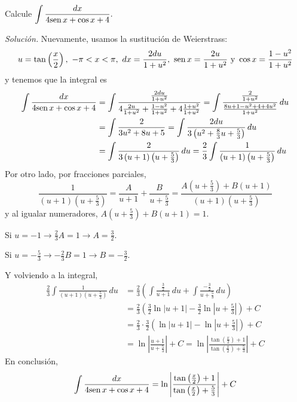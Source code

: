 \begin{ejemplo}
Calcule $\displaystyle{\int \frac{dx}{4\text{\rm sen}\,x+\cos x+4}}.$
\end{ejemplo}
\textit{Solución.} Nuevamente, usamos la sustitución de Weierstrass:
{\small
\[
u=\tan \left( \frac{x}{2}\right),\ -\pi<x<\pi,\ dx=\frac{2du}{1+u^{2}},\ \text{\rm sen}\, x=\frac{2u}{1+u^{2}}\text{ y }\cos x=\frac{1-u^{2}}{1+u^{2}}
\]
}
y tenemos que la integral es
{\small
\begin{align*}
\int \frac{dx}{4\sen x+\cos x+4}&=\int \frac{\frac{2du}{1+u^{2}}}{4\frac{2u}{1+u^{2}}+\frac{1-u^{2}}{1+u^{2}}%
+4\frac{1+u^{2}}{1+u^{2}}}=\int \frac{\frac{2}{1+u^{2}}}{\frac{%
8u+1-u^{2}+4+4u^{2}}{1+u^{2}}}\, du\\
&=\int \frac{2}{3u^{2}+8u+5}=\int \frac{2du}{%
3\left( u^{2}+\frac{8}{3}u+\frac{5}{3}\right) }\, du\\
&=\int \frac{2}{3\left( u+1\right) \left( u+\frac{5}{3}\right) }\, du=\frac{2}{3%
}\int \frac{1}{\left( u+1\right) \left( u+\frac{5}{3}\right) }\, du
\end{align*}
}
Por otro lado, por fracciones parciales,
{\small
\[
\frac{1}{\left( u+1\right) \left( u+\frac{5}{3}\right) }=\frac{A}{u+1}%
+\frac{B}{u+\frac{5}{3}}=\frac{A\left( u+\frac{5}{3}\right) +B\left(
u+1\right) }{\left( u+1\right) \left( u+\frac{5}{3}\right) }
\]
}
y al igualar numeradores, $A\left( u+\frac{5}{3}\right) +B\left( u+1\right) =1.$

Si $u=-1\rightarrow \frac{2}{3}A=1\rightarrow A=\frac{3}{2}$.

Si $u=-\frac{5}{3}\rightarrow -\frac{2}{3}B=1\rightarrow B=-\frac{3}{2}$.

Y volviendo a la integral,
{\small
\begin{align*}
	\frac{2}{3}\int \frac{1}{(u\!+\!1)(u\!+\!\frac{5}{3})} \, du
	&= \frac{2}{3}\left( \int \frac{\frac{3}{2}}{u\!+\!1} \, du + \int \frac{-\frac{3}{2}}{u\!+\!\frac{5}{3}} \, du \right) \\
	&= \frac{2}{3}\left( \frac{3}{2}\ln\left|u\!+\!1\right| - \frac{3}{2}\ln\left|u\!+\!\frac{5}{3}\right| \right) + C \\
	&= \frac{2}{3} \cdot \frac{3}{2} \left( \ln\left|u\!+\!1\right| - \ln\left|u\!+\!\frac{5}{3}\right| \right) + C \\
	&= \ln\left| \frac{u\!+\!1}{u\!+\!\frac{5}{3}} \right| + C
	= \ln\left| \frac{\tan\left(\frac{x}{2}\right)\!+\!1}{\tan\left(\frac{x}{2}\right)\!+\!\frac{5}{3}} \right| + C
\end{align*}
}
En conclusión,
\[
\int \frac{dx}{4\text{\rm sen}\, x+\cos x+4}=\ln \left\vert \frac{\tan \left( \frac{x}{2}\right) +1}{\tan
\left( \frac{x}{2}\right) +\frac{5}{3}}\right\vert +C
\]

